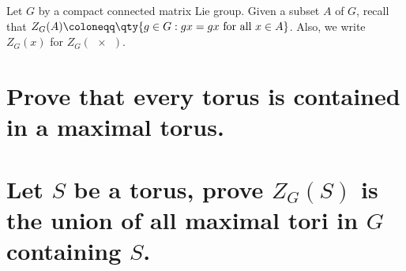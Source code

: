 \documentclass[
	pages,
	boxes,
	color=WildStrawberry
]{homework}
\begin{document}
\begin{problem}
Let $G$ by a compact connected matrix Lie group. Given a subset $A$ of $G$, recall that $Z_G(A)\defeq\qty{g\in G : gx = gx \text{ for all } x\in A}$. Also, we write $Z_G(x)$ for $Z_G(\qty{x})$.
\begin{parts}
	\part{Prove that every torus is contained in a maximal torus.}\label{part:1a}
	\part{Let $S$ be a torus, prove $Z_G(S)$ is the union of all maximal tori in $G$ containing $S$.}\label{part:1b}
\end{parts}
\end{problem}
\end{document}
